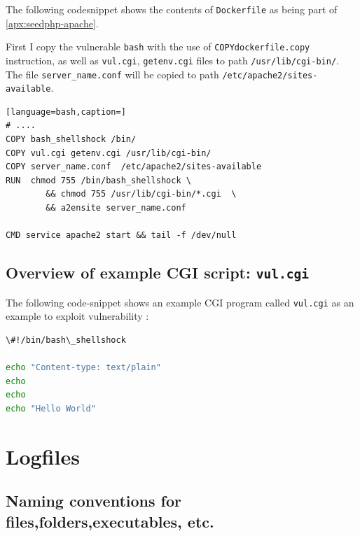 \documentclass[12pt,a4paper,twocolumn]{article}
\begin{document}
\begin{appendix}
The following codesnippet shows the contents of \lstinline{Dockerfile}
as being part of \ref{apx:seedphp-apache}. 

First I copy the vulnerable \lstinline{bash} with the use of \lstinline{COPY}\lstinline{dockerfile.copy} instruction, as well as \lstinline{vul.cgi}, \lstinline{getenv.cgi} files to path \lstinline{/usr/lib/cgi-bin/}. The file \lstinline{server_name.conf} will be copied to path \lstinline{/etc/apache2/sites-available}.

\begin{lstlisting}[language=bash,caption=]
# ....
COPY bash_shellshock /bin/
COPY vul.cgi getenv.cgi /usr/lib/cgi-bin/
COPY server_name.conf  /etc/apache2/sites-available
RUN  chmod 755 /bin/bash_shellshock \
        && chmod 755 /usr/lib/cgi-bin/*.cgi  \
        && a2ensite server_name.conf  

CMD service apache2 start && tail -f /dev/null
\end{lstlisting}




\subsection{Overview of example CGI script: \lstinline{vul.cgi}}
\label{apx:shellshocklab.vul.cgi}

The following code-snippet shows an example CGI program called \lstinline{vul.cgi} as an example to exploit vulnerability \cite{shellshock.CVE-2014-6271}: 

\begin{lstlisting}[language=bash, caption=\lstinline{vul.cgi}] 
\#!/bin/bash\_shellshock       

echo "Content-type: text/plain"
echo
echo
echo "Hello World"
\end{lstlisting}



\section{Logfiles}
%

\subsection{Naming conventions for files,folders,executables, etc.}
\label{apx:conventions}


\end{appendix}
\end{document}
